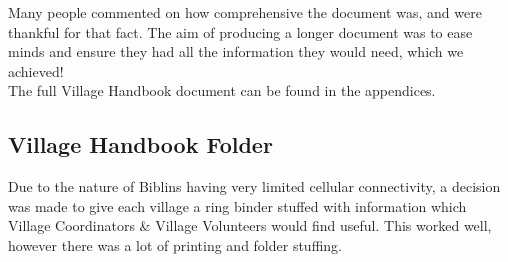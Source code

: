 Many people commented on how comprehensive the document was, and were thankful for that fact. The aim of producing a longer document was to ease minds and ensure they had all the information they would need, which we achieved!\\

The full Village Handbook document can be found in the appendices.

\subsection{Village Handbook Folder}
Due to the nature of Biblins having very limited cellular connectivity, a decision was made to give each village a ring binder stuffed with information which Village Coordinators \& Village Volunteers would find useful. This worked well, however there was a lot of printing and folder stuffing. \\

